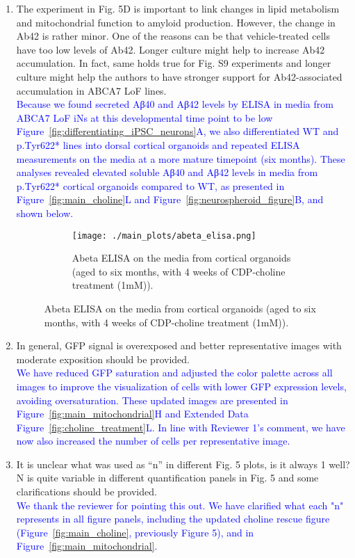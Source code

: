 \begin{enumerate}
	\item The experiment in Fig. 5D is important to link changes in lipid metabolism and mitochondrial function to amyloid production. However, the change in Ab42 is rather minor. One of the reasons can be that vehicle-treated cells have too low levels of Ab42. Longer culture might help to increase Ab42 accumulation. In fact, same holds true for Fig. S9 experiments and longer culture might help the authors to have stronger support for Ab42-associated accumulation in ABCA7 LoF lines.\\
	\textcolor{blue}{Because we found secreted Aβ40 and Aβ42 levels by ELISA in media from ABCA7 LoF iNs at this developmental time point to be low Figure~\ref{fig:differentiating_iPSC_neurons}A, we also differentiated WT and p.Tyr622* lines into dorsal cortical organoids and repeated ELISA measurements on the media at a more mature timepoint (six months). These analyses revealed elevated soluble Aβ40 and Aβ42 levels in media from p.Tyr622* cortical organoids compared to WT, as presented in Figure~\ref{fig:main_choline}L and Figure~\ref{fig:neurospheroid_figure}B, and shown below.}

	\begin{figure}[H] 
		\centering
		\begin{subfigure}[t]{.6\textwidth}
			\caption{Abeta ELISA on the media from cortical organoids (aged to six months, with 4 weeks of CDP-choline treatment (1mM)).}
			\texttt{[image: ./main\_plots/abeta\_elisa.png]}        
		\end{subfigure}  
	\end{figure}

	\item In general, GFP signal is overexposed and better representative images with moderate exposition should be provided.\\
	\textcolor{blue}{We have reduced GFP saturation and adjusted the color palette across all images to improve the visualization of cells with lower GFP expression levels, avoiding oversaturation. These updated images are presented in Figure~\ref{fig:main_mitochondrial}H and Extended Data Figure~\ref{fig:choline_treatment}L. In line with Reviewer 1's comment, we have now also increased the number of cells per representative image.} 

	\item It is unclear what was used as “n” in different Fig. 5 plots, is it always 1 well? N is quite variable in different quantification panels in Fig. 5 and some clarifications should be provided.\\
	\textcolor{blue}{We thank the reviewer for pointing this out. We have clarified what each "n" represents in all figure panels, including the updated choline rescue figure (Figure~\ref{fig:main_choline}, previously Figure 5), and in Figure~\ref{fig:main_mitochondrial}.}

\end{enumerate}

